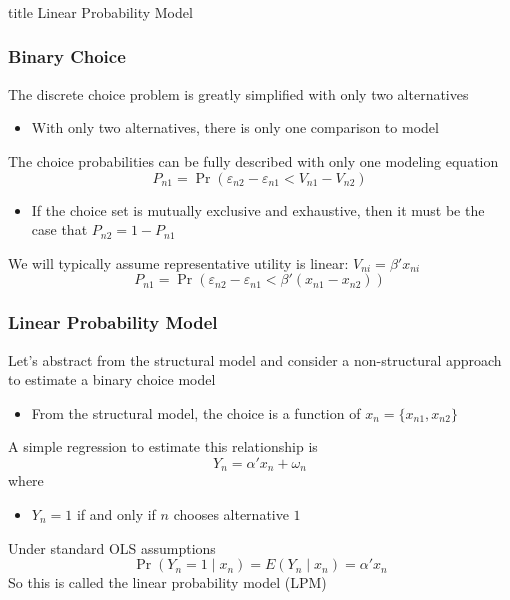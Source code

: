 \documentclass{beamer}
\begin{document}
\begin{frame}\frametitle{}
    \vfill
    \centering
    \begin{beamercolorbox}[center]{title}
        \Large Linear Probability Model
    \end{beamercolorbox}
    \vfill
\end{frame}

\begin{frame}\frametitle{Binary Choice}
    The discrete choice problem is greatly simplified with only two alternatives
    \begin{itemize}
    	\item With only two alternatives, there is only one comparison to model
    \end{itemize}
    \vspace{2ex}
    The choice probabilities can be fully described with only one modeling equation 
    $$P_{n1} = \Pr(\varepsilon_{n2} - \varepsilon_{n1} < V_{n1} - V_{n2})$$
    \begin{itemize}
    	\item If the choice set is mutually exclusive and exhaustive, then it must be the case that $P_{n2} = 1 - P_{n1}$
    \end{itemize}
    \vspace{2ex}
    We will typically assume representative utility is linear: $V_{ni} = \beta' x_{ni}$
    $$P_{n1} = \Pr(\varepsilon_{n2} - \varepsilon_{n1} < \beta' (x_{n1} - x_{n2}))$$
\end{frame}

\begin{frame}\frametitle{Linear Probability Model}
    Let's abstract from the structural model and consider a non-structural approach to estimate a binary choice model
    \begin{itemize}
    	\item From the structural model, the choice is a function of $x_n = \{x_{n1}, x_{n2}\}$
    \end{itemize}
    \vspace{2ex}
    A simple regression to estimate this relationship is
    $$Y_n = \alpha' x_n + \omega_n$$
    where
    \begin{itemize}
    	\item $Y_n = 1$ if and only if $n$ chooses alternative $1$
    \end{itemize}
    \vspace{2ex}
    Under standard OLS assumptions
    $$\Pr(Y_n = 1 \mid x_n) = E(Y_n \mid x_n) = \alpha' x_n$$
    So this is called the linear probability model (LPM)
\end{frame}
\end{document}
